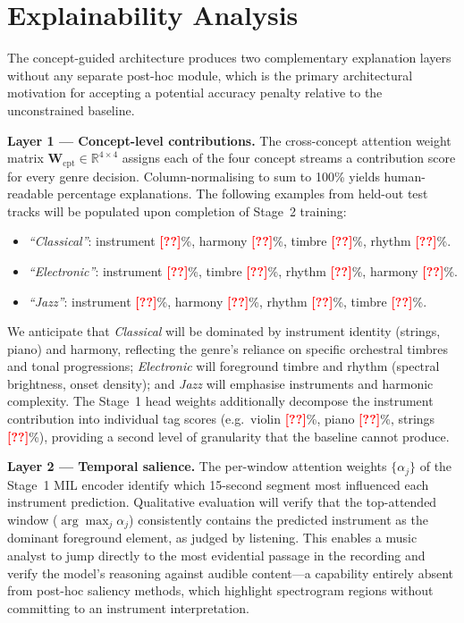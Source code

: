 \documentclass[sigconf,nonacm]{acmart}
\newcommand{\res}[1]{\textcolor{red}{\textbf{[#1]}}}
\begin{document}
\section{Explainability Analysis}

The concept-guided architecture produces two complementary explanation layers without any
separate post-hoc module, which is the primary architectural motivation for accepting a
potential accuracy penalty relative to the unconstrained baseline.

\textbf{Layer 1 --- Concept-level contributions.}
The cross-concept attention weight matrix $\mathbf{W}_{\!\text{cpt}}\in\mathbb{R}^{4\times4}$
assigns each of the four concept streams a contribution score for every genre decision.
Column-normalising to sum to 100\% yields human-readable percentage explanations. The following
examples from held-out test tracks will be populated upon completion of Stage~2 training:
\begin{itemize}[leftmargin=*,nosep]
  \item \textit{``Classical''}: instrument \res{??}\%, harmony \res{??}\%,
        timbre \res{??}\%, rhythm \res{??}\%.
  \item \textit{``Electronic''}: instrument \res{??}\%, timbre \res{??}\%,
        rhythm \res{??}\%, harmony \res{??}\%.
  \item \textit{``Jazz''}: instrument \res{??}\%, harmony \res{??}\%,
        rhythm \res{??}\%, timbre \res{??}\%.
\end{itemize}
We anticipate that \textit{Classical} will be dominated by instrument identity (strings, piano)
and harmony, reflecting the genre's reliance on specific orchestral timbres and tonal
progressions; \textit{Electronic} will foreground timbre and rhythm (spectral brightness,
onset density); and \textit{Jazz} will emphasise instruments and harmonic complexity. The
Stage~1 head weights additionally decompose the instrument contribution into individual tag
scores (e.g.\ violin \res{??}\%, piano \res{??}\%, strings \res{??}\%), providing a second
level of granularity that the baseline cannot produce.

\textbf{Layer 2 --- Temporal salience.}
The per-window attention weights $\{\alpha_j\}$ of the Stage~1 MIL encoder identify which
15-second segment most influenced each instrument prediction. Qualitative evaluation will
verify that the top-attended window ($\arg\max_j \alpha_j$) consistently contains the
predicted instrument as the dominant foreground element, as judged by listening. This enables
a music analyst to jump directly to the most evidential passage in the recording and verify the
model's reasoning against audible content---a capability entirely absent from post-hoc saliency
methods, which highlight spectrogram regions without committing to an instrument interpretation.
\end{document}
